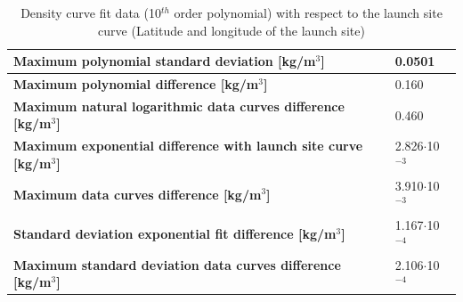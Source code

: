 
%

\begin{table}[!ht]
\begin{center}
\caption{Density curve fit data (10$^{th}$ order polynomial) with respect to the launch site curve (Latitude and longitude of the launch site)}
\label{tab:fitDeviationsDen}
\begin{tabular}{|l|l|}
\hline 
\textbf{Maximum polynomial standard deviation [kg/m$^{3}$]} & 0.0501 \\ \hline

  \textbf{Maximum polynomial difference [kg/m$^{3}$]} & 0.160 \\ \hline
  
   \textbf{Maximum natural logarithmic data curves difference [kg/m$^{3}$]} & 0.460 \\ \hline
  
    \textbf{Maximum exponential difference with launch site curve [kg/m$^{3}$]} & 2.826$\cdot$10$^{-3}$ \\ \hline
    
       \textbf{Maximum data curves difference [kg/m$^{3}$]} & 3.910$\cdot$10$^{-3}$ \\ \hline
    
      \textbf{Standard deviation exponential fit difference [kg/m$^{3}$]} & 1.167$\cdot$10$^{-4}$ \\ \hline 
      
           \textbf{Maximum standard deviation data curves difference [kg/m$^{3}$]} & 2.106$\cdot$10$^{-4}$ \\ \hline
\end{tabular}
\end{center}
\end{table}



